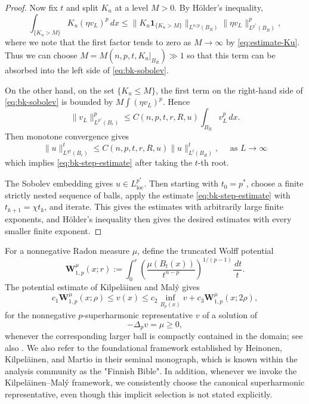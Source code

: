 \documentclass[reqno,12pt]{amsart}
\numberwithin{equation}{section}
\theoremstyle{remark}
\newcommand{\dd}{\,d}
\newcommand{\loc}{\mathrm{loc}}
\newcommand{\Wolff}{\mathbf W}
\begin{document}
\begin{proof}
Now fix $t$ and split $K_u$ at a level $M>0$.  By H\"older's inequality,
$$
 \int_{\{K_u>M\}}K_u(\eta v_L)^p\,dx
 \le \|K_u\mathbf1_{\{K_u>M\}}\|_{L^{n/p}(B_R)} \|\eta v_L\|_{L^{p^*}(B_R)}^p,
$$
where we note that the first factor tends to zero as $M\to\infty$ by \eqref{eq:estimate-Ku}.  Thus we can choose $M=M(n,p,t, K_u|_{B_R})\gg 1$ so that this term can be absorbed into the left side of \eqref{eq:bk-sobolev}.  


On the other hand, on the set $\{K_u\le M\}$, the first term on the right-hand side of \eqref{eq:bk-sobolev} is bounded by
$M\int(\eta v_L)^p$.  Hence
$$
\|v_L\|_{L^{p^*}(B_r)}^p \le C(n,p,t,r,R,u)\int_{B_R}v_L^p \,dx.
$$
Then monotone convergence  gives
$$
\|u\|_{L^{\chi t}(B_r)}^t \le C(n,p,t,r,R,u)\|u\|_{L^t(B_R)}^t,\quad \text{ as $L\to\infty$}
$$
which implies \eqref{eq:bk-step-estimate} after taking the $t$-th root.

The Sobolev embedding gives $u\in L^{p^*}_{\loc}$.  Then starting with $t_0=p^*$, choose a finite strictly nested sequence of balls, apply the estimate \eqref{eq:bk-step-estimate} with $t_{k+1}=\chi t_k$, and iterate.  This gives the estimates with arbitrarily large finite exponents, and H\"older's inequality then gives the desired estimates with every smaller finite exponent. 
\end{proof}



For a nonnegative Radon measure $\mu$, define the truncated Wolff potential
\begin{equation}\label{eq:wolff}
 \Wolff_{1,p}^{\mu}(x;r) :=\int_0^r  \left(\frac{\mu(B_t(x))}{t^{n-p}}\right)^{1/(p-1)} \frac{\dd t}{t}.
\end{equation}
The potential estimate of Kilpel\"ainen and Mal\'y
\cite[Theorem~1.6]{KM1994} gives
\begin{equation}\label{eq:KM-estimate}
 c_1\Wolff_{1,p}^{\mu}(x;\rho) \le v(x)  \le c_2\inf_{B_\rho(x)}v      +c_3\Wolff_{1,p}^{\mu}(x;2\rho),
\end{equation}
for the nonnegative $p$-superharmonic representative $v$ of a solution of
$$
-\Delta_pv=\mu\ge0,
$$
whenever the corresponding larger ball is compactly contained in the domain; see also \cite{KM2012}.
We also refer to the foundational framework established by Heinonen, Kilpel\"ainen, and Martio \cite{HKM06} in their seminal monograph, which is   known within the analysis community as the "Finnish Bible". In addition, whenever we invoke the Kilpel\"ainen--Mal\'y framework, we consistently choose the canonical superharmonic representative, even though this implicit selection is not stated explicitly. 
\end{document}
